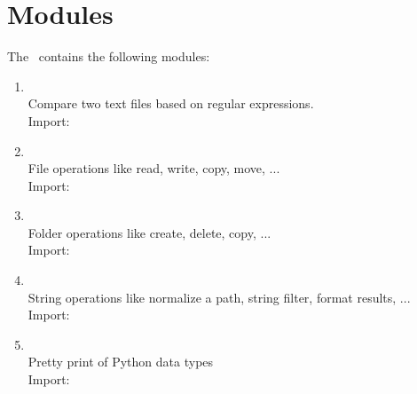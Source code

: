 %



%

\section{Modules}

The \pkg\ contains the following modules:

\begin{enumerate}
\item {}\\
   Compare two text files based on regular expressions.\\
   Import: 
\item {}\\
   File operations like read, write, copy, move, ...\\
   Import: 
\item {}\\
   Folder operations like create, delete, copy, ...\\
   Import: 
\item {}\\
   String operations like normalize a path, string filter, format results, ...\\
   Import: 
\item {}\\
   Pretty print of Python data types\\
   Import: 
\end{enumerate}

